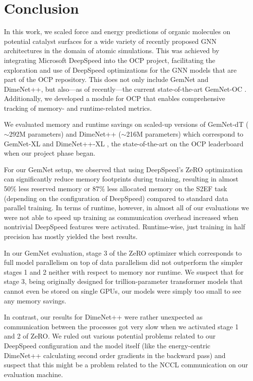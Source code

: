 \section{Conclusion}
\label{section:conclusion}

In this work, we scaled force and energy predictions of organic molecules on
potential catalyst surfaces for a wide variety of recently proposed GNN architectures
in the domain of atomic simulations. This was achieved by integrating Microsoft DeepSpeed 
into the OCP project, facilitating the exploration and use of DeepSpeed optimizations
for the GNN models that are part of the OCP repository. This does not
only include GemNet and DimeNet++, but also---as of recently---the current state-of-the-art
GemNet-OC \cite{https://doi.org/10.48550/arxiv.2204.02782}.
Additionally, we developed a module for OCP that enables comprehensive tracking
of memory- and runtime-related metrics. 

We evaluated memory and runtime savings on scaled-up versions of GemNet-dT
($\sim$292M parameters) and DimeNet++ ($\sim$216M parameters) which correspond to
GemNet-XL and DimeNet++-XL \cite{https://doi.org/10.48550/arxiv.2203.09697}, 
the state-of-the-art on the OCP leaderboard when our project phase began. 

For our GemNet setup, we observed that using DeepSpeed's ZeRO optimization 
can significantly reduce memory footprints during training, resulting in 
almost 50\% less reserved memory or 87\% less allocated memory on the S2EF task
(depending on the configuration of DeepSpeed) compared to standard data parallel training. 
In terms of runtime, however, in almost all of our evaluations we were not able to speed up 
training as communication overhead increased when 
nontrivial DeepSpeed features were activated. Runtime-wise, just training in half
precision has mostly yielded the best results.

In our GemNet evaluation, stage 3 of the ZeRO optimizer which corresponds to full model parallelism on top
of data parallelism did not outperform the simpler stages 1 and 2 neither with respect to
memory nor runtime. We suspect that for stage 3, being originally designed for trillion-parameter
transformer models that cannot even be stored on single GPUs, our models
were simply too small to see any memory savings.

In contrast, our results for DimeNet++ were rather unexpected as communication
between the processes got very slow when we activated stage 1 and 2 of ZeRO.
We ruled out various potential problems related to our DeepSpeed configuration and
the model itself (like the energy-centric DimeNet++ calculating second order gradients 
in the backward pass) and suspect that this might be a problem related to the NCCL communication on our evaluation 
machine.

